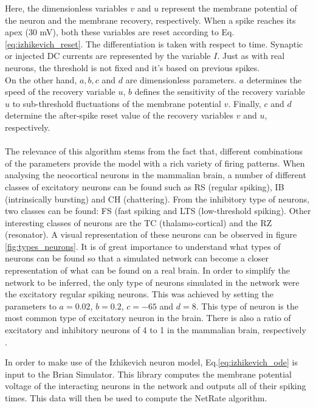 Here, the dimensionless variables $v$ and $u$ represent the membrane potential of the neuron and the membrane recovery, respectively. When a spike reaches its apex (30 mV), both these variables are reset according to Eq. \ref{eq:izhikevich_reset}. The differentiation is taken with respect to time. Synaptic or injected DC currents are represented by the variable $I$. Just as with real neurons, the threshold is not fixed and it's based on previous spikes. 
\\
On the other hand, $a, b, c$ and $d$ are dimensionless parameters. $a$ determines the speed of the recovery variable $u$, $b$ defines the sensitivity of the recovery variable $u$ to sub-threshold fluctuations of the membrane potential $v$. Finally, $c$ and $d$ determine the after-spike reset value of the recovery variables $v$ and $u$, respectively. 
\\\\
The relevance of this algorithm stems from the fact that, different combinations of the parameters provide the model with a rich variety of firing patterns. When analysing the neocortical neurons in the mammalian brain, a number of different classes of excitatory neurons can be found \cite{connors1990intrinsic, gray1996chattering} such as RS (regular spiking), IB (intrinsically bursting) and CH (chattering). From the inhibitory type of neurons, two classes can be found: FS (fast spiking and LTS (low-threshold spiking). Other interesting classes of neurons are the TC (thalamo-cortical) and the RZ (resonator). A visual representation of these neurons can be observed in figure \ref{fig:types_neurons}. It is of great importance to understand what types of neurons can be found so that a simulated network can become a closer representation of what can be found on a real brain. In order to simplify the network to be inferred, the only type of neurons simulated in the network were the excitatory regular spiking neurons. This was achieved by setting the parameters to $a=0.02$, $b=0.2$, $c=-65$ and $d=8$. This type of neuron is the most common type of excitatory neuron in the brain. There is also a ratio of excitatory and inhibitory neurons of 4 to 1 in the mammalian brain, respectively \cite{izhikevich2003simple}.

In order to make use of the Izhikevich neuron model, Eq.\ref{eq:izhikevich_ode} is input to the Brian Simulator. This library computes the membrane potential voltage of the interacting neurons in the network and outputs all of their spiking times. This data will then be used to compute the NetRate algorithm.


